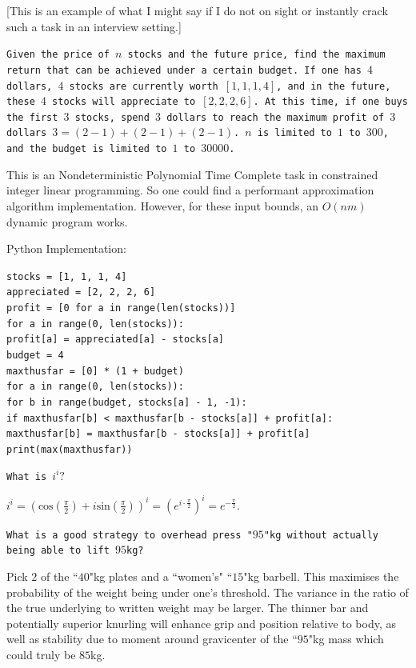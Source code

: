 [This is an example of what I might say if I do not on sight or instantly crack such a task in an interview setting.]

\texttt{Given the price of $n$ stocks and the future price, find the maximum return that can be achieved under a certain budget. If one has $4$ dollars, $4$ stocks are currently worth $[1,1,1,4]$, and in the future, these $4$ stocks will appreciate to $[2,2,2,6]$. At this time, if one buys the first $3$ stocks, spend $3$ dollars to reach the maximum profit of $3$ dollars $3=(2-1)+(2-1)+(2-1)$. $n$ is limited to $1$ to $300$, and the budget is limited to $1$ to $30000$.}

This is an Nondeterministic Polynomial Time Complete task in constrained integer linear programming. So one could find a performant approximation algorithm implementation. However, for these input bounds, an $O(nm)$ dynamic program works.

Python Implementation:

\texttt{stocks = [1, 1, 1, 4]} \\
\texttt{appreciated = [2, 2, 2, 6]} \\
\texttt{profit = [0 for a in range(len(stocks))]} \\
\texttt{for a in range(0, len(stocks)):} \\
\phantom{xxxx}\texttt{profit[a] = appreciated[a] - stocks[a]} \\
\texttt{budget = 4} \\
\texttt{maxthusfar = [0] * (1 + budget)} \\
\texttt{for a in range(0, len(stocks)):} \\
\phantom{xxxx}\texttt{for b in range(budget, stocks[a] - 1, -1):} \\
\phantom{xxxxxxxx}\texttt{if maxthusfar[b] < maxthusfar[b - stocks[a]] + profit[a]:} \\
\phantom{xxxxxxxxxxxx}\texttt{maxthusfar[b] = maxthusfar[b - stocks[a]] + profit[a]} \\
\texttt{print(max(maxthusfar))}

\texttt{What is $i^i?$}

$i^i = \left ( \text{cos}\left( \frac{\pi}{2} \right)+i \text{sin}\left( \frac{\pi}{2} \right) \right )^i = \left ( e^{i \cdot \frac{\pi}{2}} \right )^i = \boxed{e^{-\frac{\pi}{2}}}$.

\texttt{What is a good strategy to overhead press "$95$"kg without actually being able to lift $95$kg?}

Pick $2$ of the ``$40$"kg plates and a ``women's" ``$15$"kg barbell. This maximises the probability of the weight being under one's threshold. The variance in the ratio of the true underlying to written weight may be larger. The thinner bar and potentially superior knurling will enhance grip and position relative to body, as well as stability due to moment around gravicenter of the ``$95$"kg mass which could truly be $85$kg.

